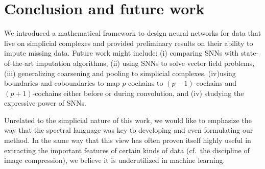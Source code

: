 \section{Conclusion and future work}

We introduced a mathematical framework to design neural networks for data that live on simplicial complexes and provided preliminary results on their ability to impute missing data.
Future work might include: (i) comparing SNNs with state-of-the-art imputation algorithms, (ii) using SNNs to solve vector field problems, (iii) generalizing coarsening and pooling to simplicial complexes, (iv)using boundaries and coboundaries to map $p$-cochains to $(p-1)$-cochains and $(p+1)$-cochains either before or during convolution, and (iv) studying the expressive power of SNNs.

Unrelated to the simplicial nature of this work, we would like to emphasize the way that the spectral language was key to developing and even formulating our method. In the same way that this view has often proven itself highly useful in extracting the important features of certain kinds of data (cf.\ the discipline of image compression), we believe it is underutilized in machine learning.

